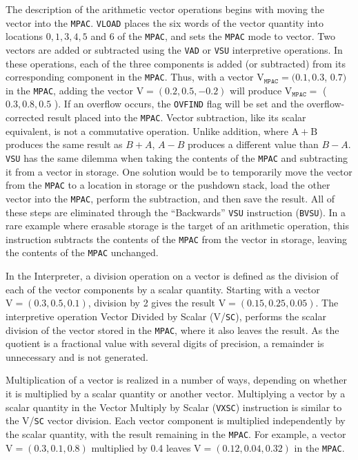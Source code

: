 \documentclass[refcap, oxford]{ahsan}
\begin{document}
The description of the arithmetic vector operations begins with moving the\\
vector into the \texttt{MPAC}. \texttt{VLOAD} places the six words of the vector quantity into locations $0,1,3,4,5$ and 6 of the \texttt{MPAC}, and sets the \texttt{MPAC} mode to vector. Two vectors are added or subtracted using the \texttt{VAD} or \texttt{VSU} interpretive operations. In these operations, each of the three components is added (or subtracted) from its corresponding component in the \texttt{MPAC}. Thus, with a vector $\mathrm{V}_{\mathrm{\texttt{MPAC}}}=(0.1,0.3$, $0.7)$ in the \texttt{MPAC}, adding the vector $\mathrm{V}=(0.2,0.5,-0.2)$ will produce $\mathrm{V}_{\mathrm{\texttt{MPAC}}}=$ ( $0.3,0.8,0.5$ ). If an overflow occurs, the \texttt{OVFIND} flag will be set and the overflow-corrected result placed into the \texttt{MPAC}. Vector subtraction, like its scalar equivalent, is not a commutative operation. Unlike addition, where $\mathrm{A}+\mathrm{B}$ produces the same result as $B+A$, $A-B$ produces a different value than $B-A$. \texttt{VSU} has the same dilemma when taking the contents of the \texttt{MPAC} and subtracting it from a vector in storage. One solution would be to temporarily move the vector from the \texttt{MPAC} to a location in storage or the pushdown stack, load the other vector into the \texttt{MPAC}, perform the subtraction, and then save the result. All of these steps are eliminated through the ``Backwards'' \texttt{VSU} instruction (\texttt{BVSU}). In a rare example where erasable storage is the target of an arithmetic operation, this instruction subtracts the contents of the \texttt{MPAC} from the vector in storage, leaving the contents of the \texttt{MPAC} unchanged.

In the Interpreter, a division operation on a vector is defined as the division of each of the vector components by a scalar quantity. Starting with a vector $\mathrm{V}=(0.3,0.5,0.1)$, division by 2 gives the result $\mathrm{V}=(0.15,0.25,0.05)$. The interpretive operation Vector Divided by Scalar (V/\texttt{SC}), performs the scalar division of the vector stored in the \texttt{MPAC}, where it also leaves the result. As the quotient is a fractional value with several digits of precision, a remainder is unnecessary and is not generated.

Multiplication of a vector is realized in a number of ways, depending on whether it is multiplied by a scalar quantity or another vector. Multiplying a vector by a scalar quantity in the Vector Multiply by Scalar (\texttt{VXSC}) instruction is similar to the V/\texttt{SC} vector division. Each vector component is multiplied independently by the scalar quantity, with the result remaining in the \texttt{MPAC}. For example, a vector $\mathrm{V}=(0.3,0.1,0.8)$ multiplied by 0.4 leaves $\mathrm{V}=(0.12,0.04,0.32)$ in the \texttt{MPAC}.
\end{document}
